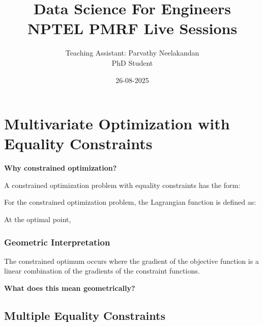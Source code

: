 \documentclass[11pt,a4paper]{article}
\title{\color{blue}Data Science For Engineers\\NPTEL PMRF Live Sessions\\}
\author{Teaching Assistant: Parvathy Neelakandan\\PhD Student}
\date{26-08-2025}
\theoremstyle{definition}
\begin{document}
\maketitle

\section*{Multivariate Optimization with Equality Constraints}

\textbf{Why constrained optimization?}
\vspace{20mm}

\begin{defbox}
A constrained optimization problem with equality constraints has the form:
\vspace{50mm}
\end{defbox}


\begin{defbox}
For the constrained optimization problem, the Lagrangian function is defined as:
\vspace{30mm}
\end{defbox}

\begin{defbox}
At the optimal point,
\vspace{40mm}
\end{defbox}

\begin{examplebox}
\vspace{160mm}
\end{examplebox}

\subsubsection*{Geometric Interpretation}

The constrained optimum occurs where the gradient of the objective function is a linear combination of the gradients of the constraint functions. 
\vspace{5mm}

\noindent \textbf{What does this mean geometrically?}
\vspace{70mm}
\begin{examplebox}
\vspace{70mm}
\end{examplebox}


\subsection*{Multiple Equality Constraints}
\end{document}
